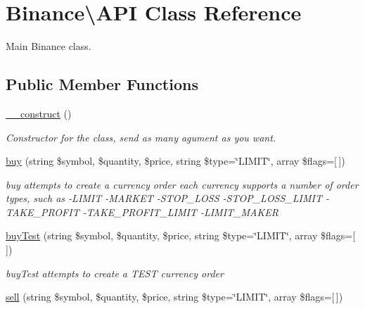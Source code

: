 \hypertarget{classBinance_1_1API}{\section{Binance\textbackslash{}A\-P\-I Class Reference}
\label{classBinance_1_1API}
}


Main Binance class.  


\subsection*{Public Member Functions}
\begin{DoxyCompactItemize}
\item 
\hyperlink{classBinance_1_1API_adbaefdc26d86ac1fd69ad101e0905c78}{\-\_\-\-\_\-construct} ()
\begin{DoxyCompactList}\small\item\em Constructor for the class, send as many agument as you want. \end{DoxyCompactList}\item 
\hyperlink{classBinance_1_1API_a98bf564a5ff752a2393bc626b222905e}{buy} (string \$symbol, \$quantity, \$price, string \$type=\char`\"{}L\-I\-M\-I\-T\char`\"{}, array \$flags=\mbox{[}$\,$\mbox{]})
\begin{DoxyCompactList}\small\item\em buy attempts to create a currency order each currency supports a number of order types, such as -\/\-L\-I\-M\-I\-T -\/\-M\-A\-R\-K\-E\-T -\/\-S\-T\-O\-P\-\_\-\-L\-O\-S\-S -\/\-S\-T\-O\-P\-\_\-\-L\-O\-S\-S\-\_\-\-L\-I\-M\-I\-T -\/\-T\-A\-K\-E\-\_\-\-P\-R\-O\-F\-I\-T -\/\-T\-A\-K\-E\-\_\-\-P\-R\-O\-F\-I\-T\-\_\-\-L\-I\-M\-I\-T -\/\-L\-I\-M\-I\-T\-\_\-\-M\-A\-K\-E\-R \end{DoxyCompactList}\item 
\hyperlink{classBinance_1_1API_a9e199a90097fbee4e89e2777534599b7}{buy\-Test} (string \$symbol, \$quantity, \$price, string \$type=\char`\"{}L\-I\-M\-I\-T\char`\"{}, array \$flags=\mbox{[}$\,$\mbox{]})
\begin{DoxyCompactList}\small\item\em buy\-Test attempts to create a T\-E\-S\-T currency order \end{DoxyCompactList}\item 
\hyperlink{classBinance_1_1API_aa5d028c98ced18dab5194009f4abdb0e}{sell} (string \$symbol, \$quantity, \$price, string \$type=\char`\"{}L\-I\-M\-I\-T\char`\"{}, array \$flags=\mbox{[}$\,$\mbox{]})

\end{DoxyCompactItemize}
